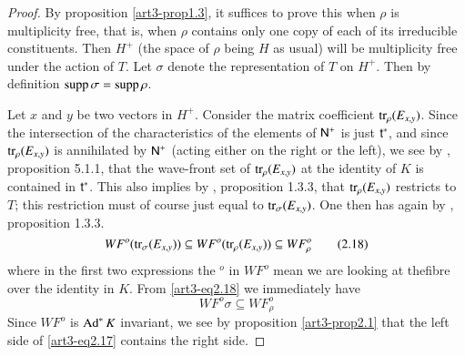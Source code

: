 \begin{proof}
By proposition \ref{art3-prop1.3}, it suffices to prove this when $\rho$ is multiplicity free, that is, when $\rho$ contains only one copy of each of its irreducible constituents. Then $H^{+}$ (the space of $\rho$ being $H$ as usual) will be multiplicity free under the action of $T$. Let $\sigma$ denote the representation of $T$ on $H^{+}$. Then by definition $\operatorname{supp} \sigma=\operatorname{supp} \rho$.

Let $x$ and $y$ be two vectors in $H^{+}$. Consider the matrix coefficient $\operatorname{tr}_{\rho}(E_{x,y})$. Since the intersection of the characteristics of the elements of $\mathsf{N}^{+}$ is just $\mathsf{t}^{*}$, and since $\operatorname{tr}_{\rho}(E_{x,y})$ is annihilated by $\mathsf{N}^{+}$ (acting either on the right or the left), we see by \cite{art3-D}, proposition 5.1.1, that the wave-front set of $\operatorname{tr}_{\rho}(E_{x,y})$ at the identity of $K$ is contained in $\mathsf{t}^{*}$. This also implies by \cite{art3-D}, proposition 1.3.3, that $\operatorname{tr}_{\rho}(E_{x,y})$ restricts to $T$; this restriction must of course just equal to $\operatorname{tr}_{\sigma}(E_{x,y})$. One then has again by \cite{art3-D}, proposition 1.3.3.
\begin{equation*}
WF^{o}(\operatorname{tr}_{\sigma}(E_{x,y}))\subseteq WF^{o}(\operatorname{tr}_{\rho}(E_{x,y}))\subseteq WF^{o}_{\rho}\tag{2.18}\label{art3-eq2.18}
\end{equation*}
where in the first two expressions the $^{o}$ in $WF^{o}$ mean we are looking at the\pageoriginale fibre over the identity in $K$. From \eqref{art3-eq2.18} we immediately have
\begin{equation*}
WF^{o}\sigma \subseteq WF^{o}_{\rho}\tag{2.19}\label{art3-eq2.19}
\end{equation*}
Since $WF^{o}$ is $\operatorname{Ad}^{*}K$ invariant, we see by proposition \ref{art3-prop2.1} that the left side of \eqref{art3-eq2.17} contains the right side.


\end{proof}
